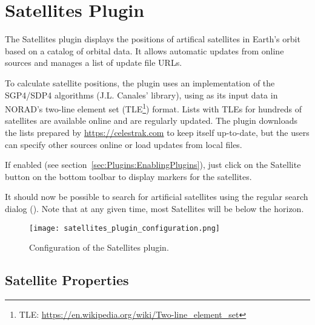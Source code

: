\newpage
\section{Satellites Plugin}
\label{sec:plugins:Satellites}


\noindent The Satellites plugin displays the positions of artifical satellites in Earth's orbit based on a catalog of orbital data. It allows
automatic updates from online sources and manages a list of update
file URLs.

To calculate satellite positions, the plugin uses an implementation of
the SGP4/SDP4 algorithms (J.L. Canales'  library), using
as its input data in NORAD's two-line element set
(TLE\footnote{TLE: \url{https://en.wikipedia.org/wiki/Two-line_element_set}})
format. Lists with TLEs for hundreds of satellites are available
online and are regularly updated. The plugin downloads the lists
prepared by \url{https://celestrak.com} to keep itself up-to-date, but the users can
specify other sources online or load updates from local files.

If enabled (see
section~\ref{sec:Plugins:EnablingPlugins}), just click on the
Satellite button   on the bottom
toolbar to display markers for the satellites.

It should now be possible to search for artificial satellites using
the regular search dialog (). Note that at any given time, most
Satellites will be below the horizon.

\begin{figure}[htbp]
\centering\texttt{[image: satellites\_plugin\_configuration.png]}
\caption{Configuration of the Satellites plugin.}
\label{fig:plugins:Satellites:Configuration}
\end{figure}

\subsection{Satellite Properties}
\label{sec:plugins:Satellites:properties}

